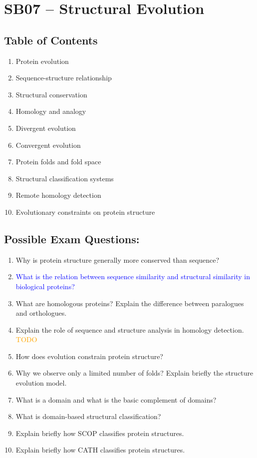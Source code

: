 \section{SB07 -- Structural Evolution \done}

\subsection*{Table of Contents}

\begin{enumerate}
\item Protein evolution
\item Sequence-structure relationship
\item Structural conservation
\item Homology and analogy
\item Divergent evolution
\item Convergent evolution
\item Protein folds and fold space
\item Structural classification systems
\item Remote homology detection
\item Evolutionary constraints on protein structure
\end{enumerate}

\subsection*{Possible Exam Questions:}

\begin{enumerate}
\item{Why is protein structure generally more conserved than sequence? \done}
\item{\textcolor{blue}{What is the relation between sequence similarity and structural similarity in biological proteins?}\done}
\item{What are homologous proteins? Explain the difference between paralogues and orthologues. \done}
\item{Explain the role of sequence and structure analysis in homology detection. \textcolor{orange}{TODO}}
\item{How does evolution constrain protein structure? \done}
\item {Why we observe only a limited number of folds? Explain briefly the structure evolution model. \done}
\item{What is a domain and what is the basic complement of domains? \done}
\item{What is domain-based structural classification?  \done}
\item{Explain briefly how SCOP classifies protein structures. \done}
\item{Explain briefly how CATH classifies protein structures. \done}
\end{enumerate}

